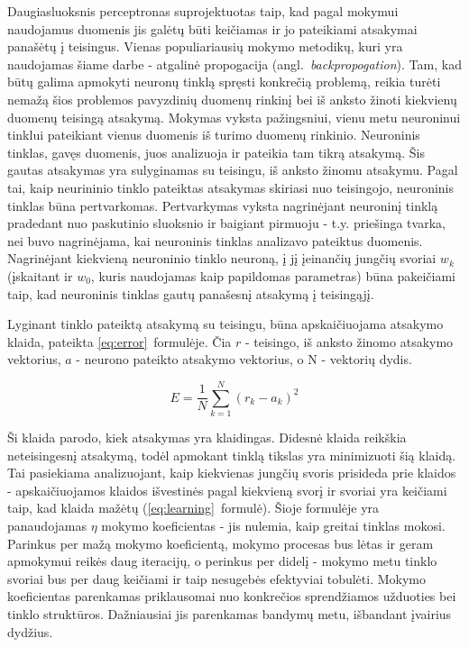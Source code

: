 \documentclass{VUMIFPSbakalaurinis}
\begin{document}
Daugiasluoksnis perceptronas suprojektuotas taip, kad pagal mokymui naudojamus duomenis jis galėtų būti keičiamas ir jo pateikiami atsakymai panašėtų į teisingus.
Vienas populiariausių mokymo metodikų, kuri yra naudojamas šiame darbe - atgalinė propogacija (angl.~\textit{backpropogation}).
Tam, kad būtų galima apmokyti neuronų tinklą spręsti konkrečią problemą, reikia turėti nemažą šios problemos pavyzdinių duomenų rinkinį bei iš anksto žinoti kiekvienų duomenų teisingą atsakymą.
Mokymas vyksta pažingsniui, vienu metu neuroninui tinklui pateikiant vienus duomenis iš turimo duomenų rinkinio.
Neuroninis tinklas, gavęs duomenis, juos analizuoja ir pateikia tam tikrą atsakymą.
Šis gautas atsakymas yra sulyginamas su teisingu, iš anksto žinomu atsakymu.
Pagal tai, kaip neurininio tinklo pateiktas atsakymas skiriasi nuo teisingojo, neuroninis tinklas būna pertvarkomas.
Pertvarkymas vyksta nagrinėjant neuroninį tinklą pradedant nuo paskutinio sluoksnio ir baigiant pirmuoju - t.y. priešinga tvarka, nei buvo nagrinėjama, kai neuroninis tinklas analizavo pateiktus duomenis.
Nagrinėjant kiekvieną neuroninio tinklo neuroną, į jį įeinančių jungčių svoriai $w_k$ (įskaitant ir $w_0$, kuris naudojamas kaip papildomas parametras) būna pakeičiami taip, kad neuroninis tinklas gautų panašesnį atsakymą į teisingąjį.

Lyginant tinklo pateiktą atsakymą su teisingu, būna apskaičiuojama atsakymo klaida, pateikta \ref{eq:error}~formulėje.
Čia $r$ - teisingo, iš anksto žinomo atsakymo vektorius, $a$ - neurono pateikto atsakymo vektorius, o N - vektorių dydis.

\begin{equation} \label{eq:error}
E = \frac{1}{N} \sum_{k=1}^N (r_k - a_k)^2
\end{equation}

Ši klaida parodo, kiek atsakymas yra klaidingas.
Didesnė klaida reikškia neteisingesnį atsakymą, todėl apmokant tinklą tikslas yra minimizuoti šią klaidą.
Tai pasiekiama analizuojant, kaip kiekvienas jungčių svoris prisideda prie klaidos - apskaičiuojamos klaidos išvestinės pagal kiekvieną svorį ir svoriai yra keičiami taip, kad klaida mažėtų (\ref{eq:learning}~formulė).
Šioje formulėje yra panaudojamas $\eta$ mokymo koeficientas - jis nulemia, kaip greitai tinklas mokosi.
Parinkus per mažą mokymo koeficientą, mokymo procesas bus lėtas ir geram apmokymui reikės daug iteracijų, o perinkus per didelį - mokymo metu tinklo svoriai bus per daug keičiami ir taip nesugebės efektyviai tobulėti.
Mokymo koeficientas parenkamas priklausomai nuo konkrečios sprendžiamos užduoties bei tinklo struktūros.
Dažniausiai jis parenkamas bandymų metu, išbandant įvairius dydžius.
\end{document}

